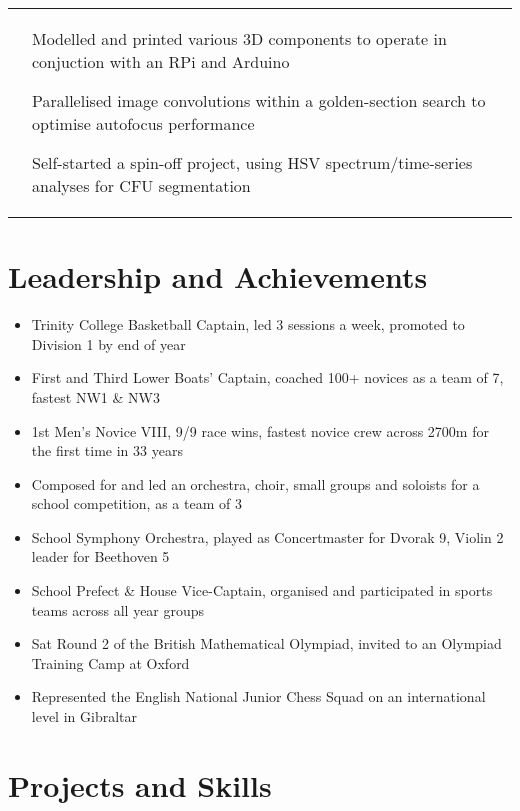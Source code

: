 \documentclass[letterpaper, 10pt]{article}
\begin{document}
{\begin{tabularx}{\linewidth}{>{\raggedleft}p{2.1cm}|X}
					& \vspace{-.5\baselineskip}\begin{compact}
						\item Modelled and printed various 3D components to operate in conjuction with an RPi and Arduino
						\item Parallelised image convolutions within a golden-section search to optimise autofocus performance
						\item Self-started a spin-off project, using HSV spectrum/time-series analyses for CFU segmentation
						\vspace{-\baselineskip}
					\end{compact}
\end{tabularx}


\section*{Leadership and Achievements}
\vspace{-\baselineskip}
\begin{multicols}{2}
\begin{itemize}
    \itemsep-.2em
	\item Trinity College Basketball Captain, led 3 sessions a week, promoted to Division 1 by end of year%
	\item First and Third Lower Boats' Captain, coached 100+ novices as a team of 7, fastest NW1 \& NW3%
    \item 1st Men's Novice VIII, 9/9 race wins, fastest novice crew across 2700m for the first time in 33 years%
	\item Composed for and led an orchestra, choir, small groups and soloists for a school competition, as a team of 3%
    \vspace{-\baselineskip}
    \vfill\null\columnbreak
    \item School Symphony Orchestra, played as Concertmaster for Dvorak 9, Violin 2 leader for Beethoven 5%
    \item School Prefect \& House Vice-Captain, organised and participated in sports teams across all year groups%
	\item Sat Round 2 of the British Mathematical Olympiad, invited to an Olympiad Training Camp at Oxford%
	\item Represented the English National Junior Chess Squad on an international level in Gibraltar %
	\vspace{-\baselineskip}
\end{itemize}
\end{multicols}

\section*{Projects and Skills}
}
\end{document}
